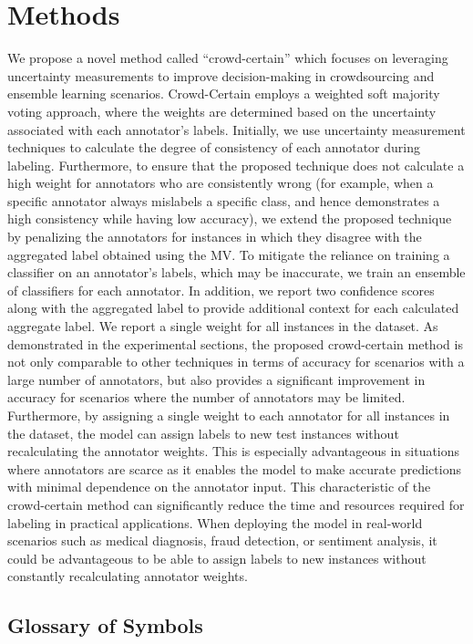 \section{Methods}
We propose a novel method  called ``crowd-certain'' which focuses on leveraging uncertainty measurements to improve decision-making in crowdsourcing and ensemble learning scenarios. Crowd-Certain employs a weighted soft majority voting approach, where the weights are determined based on the uncertainty associated with each annotator's labels. Initially, we use uncertainty measurement techniques to calculate the degree of consistency of each annotator during labeling. Furthermore, to ensure that the proposed technique does not calculate a high weight for annotators who are consistently wrong (for example, when a specific annotator always mislabels a specific class, and hence demonstrates a high consistency while having low accuracy), we extend the proposed technique by penalizing the annotators for instances in which they disagree with the aggregated label obtained using the MV\@. To mitigate the reliance on training a classifier on an annotator's labels, which may be inaccurate, we train an ensemble of classifiers for each annotator. In addition, we report two confidence scores along with the aggregated label to provide additional context for each calculated aggregate label. We report a single weight for all instances in the dataset. As demonstrated in the experimental sections, the proposed crowd-certain method is not only comparable to other techniques in terms of accuracy for scenarios with a large number of annotators, but also provides a significant improvement in accuracy for scenarios where the number of annotators may be limited. Furthermore, by assigning a single weight to each annotator for all instances in the dataset, the model can assign labels to new test instances without recalculating the annotator weights. This is especially advantageous in situations where annotators are scarce as it enables the model to make accurate predictions with minimal dependence on the annotator input. This characteristic of the crowd-certain method can significantly reduce the time and resources required for labeling in practical applications. When deploying the model in real-world scenarios such as medical diagnosis, fraud detection, or sentiment analysis, it could be advantageous to be able to assign labels to new instances without constantly recalculating annotator weights.


\subsection{Glossary of Symbols}

